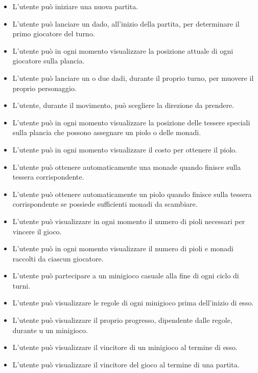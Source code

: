 \begin{itemize}
      \item L'utente può iniziare una nuova partita.
      \item L'utente può lanciare un dado, all'inizio della partita, per determinare il 
            primo giocatore del turno.
      \item L'utente può in ogni momento visualizzare la posizione attuale di ogni giocatore
            sulla plancia.
      \item L'utente può lanciare un o due dadi, durante il proprio turno, per muovere il proprio
            personaggio.
      \item L'utente, durante il movimento, può scegliere la direzione da prendere.
      \item L'utente può in ogni momento visualizzare la posizione delle tessere speciali sulla
            plancia che possono assegnare un piolo o delle monadi.
      \item L'utente può in ogni momento visualizzare il costo per ottenere il piolo.
      \item L'utente può ottenere automaticamente una monade quando finisce sulla tessera 
            corrispondente.
      \item L'utente può ottenere automaticamente un piolo quando finisce sulla tessera 
            corrispondente se possiede sufficienti monadi da scambiare.
      \item L'utente può visualizzare in ogni momento il numero di pioli necessari per vincere 
            il gioco.
      \item L'utente può in ogni momento visualizzare il numero di pioli e monadi raccolti 
            da ciascun giocatore.
      \item L'utente può partecipare a un minigioco casuale alla fine di ogni ciclo di turni.
      \item L'utente può visualizzare le regole di ogni minigioco prima dell'inizio di esso.
      \item L'utente può visualizzare il proprio progresso, dipendente dalle regole, durante u
            un minigioco.
      \item L'utente può visualizzare il vincitore di un minigioco al termine di esso.
      \item L'utente può visualizzare il vincitore del gioco al termine di una partita.
\end{itemize}

